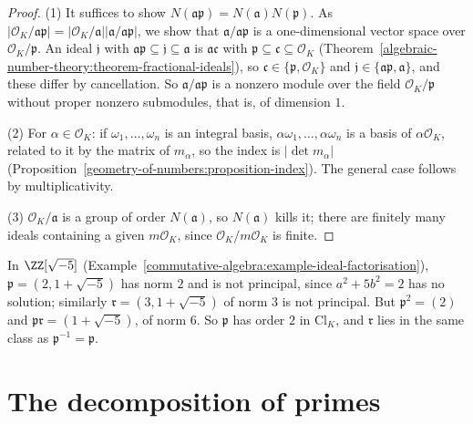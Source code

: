 \begin{proof}
(1) It suffices to show $N(\mathfrak{a}\mathfrak{p}) = N(\mathfrak{a})N(\mathfrak{p})$. As $|\mathcal{O}_K/\mathfrak{a}\mathfrak{p}| = |\mathcal{O}_K/\mathfrak{a}||\mathfrak{a}/\mathfrak{a}\mathfrak{p}|$, we show that $\mathfrak{a}/\mathfrak{a}\mathfrak{p}$
is a one-dimensional vector space over $\mathcal{O}_K/\mathfrak{p}$. An ideal $\mathfrak{j}$ with $\mathfrak{a}\mathfrak{p} \subseteq \mathfrak{j} \subseteq \mathfrak{a}$ is $\mathfrak{a}\mathfrak{c}$ with $\mathfrak{p} \subseteq \mathfrak{c} \subseteq \mathcal{O}_K$
(Theorem~\ref{algebraic-number-theory:theorem-fractional-ideals}), so $\mathfrak{c} \in \{\mathfrak{p}, \mathcal{O}_K\}$ and $\mathfrak{j} \in \{\mathfrak{a}\mathfrak{p}, \mathfrak{a}\}$, and these differ by cancellation. So
$\mathfrak{a}/\mathfrak{a}\mathfrak{p}$ is a nonzero module over the field $\mathcal{O}_K/\mathfrak{p}$ without proper nonzero submodules, that is, of dimension $1$.

(2) For $\alpha \in \mathcal{O}_K$: if $\omega_1, \dots, \omega_n$ is an integral basis, $\alpha\omega_1, \dots, \alpha\omega_n$ is a basis of $\alpha\mathcal{O}_K$, related to it by the matrix of $m_\alpha$, so the index is
$|\det m_\alpha|$ (Proposition~\ref{geometry-of-numbers:proposition-index}). The general case follows by multiplicativity.

(3) $\mathcal{O}_K/\mathfrak{a}$ is a group of order $N(\mathfrak{a})$, so $N(\mathfrak{a})$ kills it; there are finitely many ideals containing a given $m\mathcal{O}_K$, since $\mathcal{O}_K/m\mathcal{O}_K$ is finite.
\end{proof}

\begin{example}\label{algebraic-number-theory:example-sqrt-minus-five}
In $\ZZ[\sqrt{-5}]$ (Example~\ref{commutative-algebra:example-ideal-factorisation}), $\mathfrak{p} = (2, 1 + \sqrt{-5})$ has norm $2$ and is not principal, since $a^2 + 5b^2 = 2$ has no solution; similarly
$\mathfrak{r} = (3, 1 + \sqrt{-5})$ of norm $3$ is not principal. But $\mathfrak{p}^2 = (2)$ and $\mathfrak{p}\mathfrak{r} = (1 + \sqrt{-5})$, of norm $6$. So $\mathfrak{p}$ has order $2$ in $\mathrm{Cl}_K$, and
$\mathfrak{r}$ lies in the same class as $\mathfrak{p}^{-1} = \mathfrak{p}$.
\end{example}

\section{The decomposition of primes}\label{algebraic-number-theory:section-decomposition}

